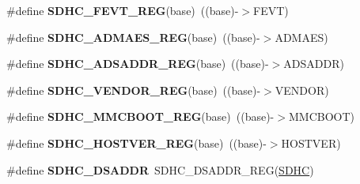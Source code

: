 \begin{DoxyCompactItemize}
\item 
\#define {\bfseries S\+D\+H\+C\+\_\+\+F\+E\+V\+T\+\_\+\+R\+EG}(base)~((base)-\/$>$F\+E\+VT)\hypertarget{group__SDHC__Register__Accessor__Macros_gaadc28a18096ddb50bff7f7b954728d05}{}\label{group__SDHC__Register__Accessor__Macros_gaadc28a18096ddb50bff7f7b954728d05}

\item 
\#define {\bfseries S\+D\+H\+C\+\_\+\+A\+D\+M\+A\+E\+S\+\_\+\+R\+EG}(base)~((base)-\/$>$A\+D\+M\+A\+ES)\hypertarget{group__SDHC__Register__Accessor__Macros_ga51bd53d6e7c47390748b6b15f69a6769}{}\label{group__SDHC__Register__Accessor__Macros_ga51bd53d6e7c47390748b6b15f69a6769}

\item 
\#define {\bfseries S\+D\+H\+C\+\_\+\+A\+D\+S\+A\+D\+D\+R\+\_\+\+R\+EG}(base)~((base)-\/$>$A\+D\+S\+A\+D\+DR)\hypertarget{group__SDHC__Register__Accessor__Macros_ga9432cad10f3bb51cb42e60bd2731a750}{}\label{group__SDHC__Register__Accessor__Macros_ga9432cad10f3bb51cb42e60bd2731a750}

\item 
\#define {\bfseries S\+D\+H\+C\+\_\+\+V\+E\+N\+D\+O\+R\+\_\+\+R\+EG}(base)~((base)-\/$>$V\+E\+N\+D\+OR)\hypertarget{group__SDHC__Register__Accessor__Macros_gacf1f267f49fec9d5b600c95b7623c421}{}\label{group__SDHC__Register__Accessor__Macros_gacf1f267f49fec9d5b600c95b7623c421}

\item 
\#define {\bfseries S\+D\+H\+C\+\_\+\+M\+M\+C\+B\+O\+O\+T\+\_\+\+R\+EG}(base)~((base)-\/$>$M\+M\+C\+B\+O\+OT)\hypertarget{group__SDHC__Register__Accessor__Macros_ga044d263f52b86072ee45b70deb16bfbb}{}\label{group__SDHC__Register__Accessor__Macros_ga044d263f52b86072ee45b70deb16bfbb}

\item 
\#define {\bfseries S\+D\+H\+C\+\_\+\+H\+O\+S\+T\+V\+E\+R\+\_\+\+R\+EG}(base)~((base)-\/$>$H\+O\+S\+T\+V\+ER)\hypertarget{group__SDHC__Register__Accessor__Macros_gad11dcba8920d90c88672b522199da534}{}\label{group__SDHC__Register__Accessor__Macros_gad11dcba8920d90c88672b522199da534}

\item 
\#define {\bfseries S\+D\+H\+C\+\_\+\+D\+S\+A\+D\+DR}~S\+D\+H\+C\+\_\+\+D\+S\+A\+D\+D\+R\+\_\+\+R\+EG(\hyperlink{group__SDHC__Peripheral__Access__Layer_gadfa975565f8f38eb596ca3ed92df30c8}{S\+D\+HC})\hypertarget{group__SDHC__Register__Accessor__Macros_ga49ef29273fdcfe72894e1c09705d03e1}{}\label{group__SDHC__Register__Accessor__Macros_ga49ef29273fdcfe72894e1c09705d03e1}


\end{DoxyCompactItemize}
